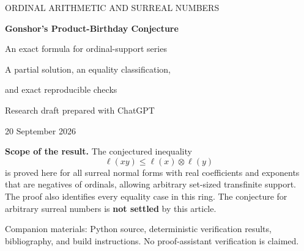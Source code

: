 \documentclass[11pt,letterpaper]{article}
\theoremstyle{definition}
\theoremstyle{remark}
\newcommand{\A}{\mathscr{A}}
\newcommand{\bd}{\ell}
\newcommand{\np}{\mathbin{\otimes}}
\begin{document}
\hypersetup{pageanchor=false}%
\begin{titlepage}
\thispagestyle{empty}
\vspace*{0.25cm}
{\color{accent}\large ORDINAL ARITHMETIC AND SURREAL NUMBERS\par}
\vspace{0.4cm}
{\color{ink}\huge\bfseries Gonshor's Product-Birthday Conjecture\par}
\vspace{0.45cm}
{\color{ink}\LARGE An exact formula for ordinal-support series\par}
\vspace{0.45cm}
{\large A partial solution, an equality classification,\par
and exact reproducible checks\par}
\vspace{0.45cm}
{Research draft prepared with ChatGPT\par
20 September 2026\par}
\vspace{0.45cm}
\begin{resultbox}
\textbf{Scope of the result.}
The conjectured inequality
\[
 \bd(xy)\leq \bd(x)\np\bd(y)
\]
is proved here for all surreal normal forms with real coefficients and
exponents that are negatives of ordinals, allowing arbitrary set-sized
transfinite support. The proof also identifies every equality case in this
ring. The conjecture for arbitrary surreal numbers is \textbf{not settled}
by this article.
\end{resultbox}
\vspace{0.15cm}
\begin{abstract}
Gonshor's product-birthday conjecture asks whether the canonical sign length
of a surreal product is bounded by the natural product of the sign lengths
of its factors. We investigate the ring
\(\A=\{\sum_{\alpha\in S}c_\alpha\omega^{-\alpha}\}\), where
\(S\) is any set of ordinals and the nonzero coefficients are real.
Specializing the classical reduced-sign-expansion theorem gives an exact
birthday formula determined by the supremum of the support, the last
coefficient when one exists, and one endpoint correction. This yields a
sharp support bound for products and shows that multiplication does not
increase the leading Cantor degree of the birthday inside \(\A\).
Consequently the conjecture holds throughout \(\A\), strictly except for
zero factors, factors equal to \(\pm1\), and pairs of ordinary integers.
We also obtain a four-coefficient formula for finite-support product
birthdays and describe natural set-sized local subrings. Exact rational
computations check the endpoint formula on 64,401 series and the product
results on 96,636 pairs. The transfinite statements are established by
written proofs, not by these finite tests. Historical priority for these
particular special-case results has not been established.
\end{abstract}
\vfill
{\small\color{ink}Companion materials: Python source, deterministic verification
results, bibliography, and build instructions. No proof-assistant
verification is claimed.}
\end{titlepage}
\hypersetup{pageanchor=true}%
\end{document}
